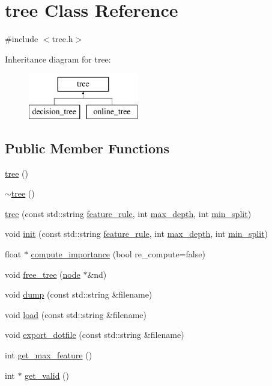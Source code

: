\hypertarget{classtree}{\section{tree Class Reference}
\label{classtree}
}


{\ttfamily \#include $<$tree.\+h$>$}

Inheritance diagram for tree\+:\begin{figure}[H]
\begin{center}
\leavevmode
\includegraphics[height=2.000000cm]{classtree}
\end{center}
\end{figure}
\subsection*{Public Member Functions}
\begin{DoxyCompactItemize}
\item 
\hyperlink{classtree_a9f2a566ac2710fafc31232456780e82d}{tree} ()
\item 
\hyperlink{classtree_a05f3faa3c9a8f6fed237e2d0f6172244}{$\sim$tree} ()
\item 
\hyperlink{classtree_a356d6ebfe68b6e4ac466664c4f2d2581}{tree} (const std\+::string \hyperlink{classtree_a5aba3b77a347165517a20d5fab94382d}{feature\+\_\+rule}, int \hyperlink{classtree_a0a9f968fac827d3239be67488c34fb21}{max\+\_\+depth}, int \hyperlink{classtree_ae70cd626c0b50a0b8306a94a9e5e8fd7}{min\+\_\+split})
\item 
void \hyperlink{classtree_a03aebcb3102b4f6503b5bc69288297e8}{init} (const std\+::string \hyperlink{classtree_a5aba3b77a347165517a20d5fab94382d}{feature\+\_\+rule}, int \hyperlink{classtree_a0a9f968fac827d3239be67488c34fb21}{max\+\_\+depth}, int \hyperlink{classtree_ae70cd626c0b50a0b8306a94a9e5e8fd7}{min\+\_\+split})
\item 
float $\ast$ \hyperlink{classtree_ae03f6dd2597846c65c1c037728b06bcd}{compute\+\_\+importance} (bool re\+\_\+compute=false)
\item 
void \hyperlink{classtree_a4ca3902b09e854a76f1fb56bb71599f6}{free\+\_\+tree} (\hyperlink{classnode}{node} $\ast$\&nd)
\item 
void \hyperlink{classtree_a634ee04f1f89801a9f295e11cc5ce149}{dump} (const std\+::string \&filename)
\item 
void \hyperlink{classtree_a680d0cc993c3a3d3ef10c891de69960f}{load} (const std\+::string \&filename)
\item 
void \hyperlink{classtree_abc6048c70de7490eabf2433d46067b7b}{export\+\_\+dotfile} (const std\+::string \&filename)
\item 
int \hyperlink{classtree_a8042d0897915fdfeeca4b4d75515b96c}{get\+\_\+max\+\_\+feature} ()
\item 
int $\ast$ \hyperlink{classtree_a1c1b61f1cc803d0a48d294fd1c49d1cd}{get\+\_\+valid} ()
\end{DoxyCompactItemize}
